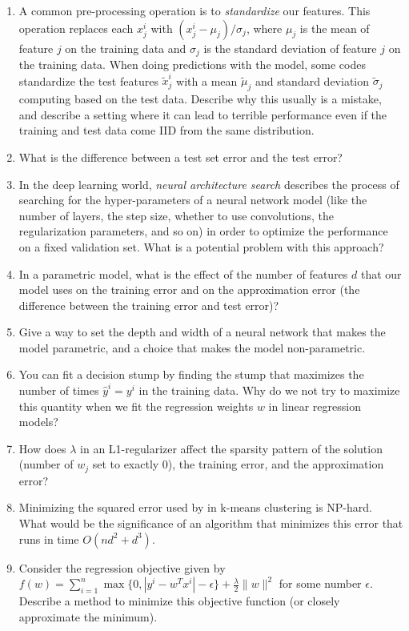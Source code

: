 \documentclass{article}
\def\blu#1{{\color{blu}#1}}
\def\norm#1{\|#1\|}
\def\enum#1{\begin{enumerate}#1\end{enumerate}}
\begin{document}
\blu{
\enum{
\item A common pre-processing operation is to \emph{standardize} our features. This operation replaces each $x_j^i$ with $(x_j^i - \mu_j)/\sigma_j$, where $\mu_j$ is the mean of feature $j$ on the training data and $\sigma_j$ is the standard deviation of feature $j$ on the training data. When doing predictions with the model, some codes standardize the test features $\tilde{x}_j^i$ with a mean $\tilde{\mu}_j$ and standard deviation $\tilde{\sigma}_j$ computing based on the test data. Describe why this usually is a mistake, and describe a setting where it can lead to terrible performance even if the training and test data come IID from the same distribution.
\item What is the difference between a test set error and the test error?
\item  In the deep learning world, \emph{neural architecture search} describes the process of searching for the hyper-parameters of a neural network model (like the number of layers, the step size, whether to use convolutions, the regularization parameters, and so on) in order to optimize the performance on a fixed validation set. What is a potential problem with this approach?
\item In a parametric model, what is the effect of the number of features $d$ that our model uses on the training error and on the approximation error (the difference between the training error and test error)?
\item Give a way to set the depth and width of a neural network that makes the model parametric, and a choice that makes the model non-parametric.
\item You can fit a decision stump by finding the stump that maximizes the number of times $\hat{y}^i = y^i$ in the training data. Why do we not try to maximize this quantity when we fit the regression weights $w$ in linear regression models?
\item  How does $\lambda$ in an L1-regularizer affect the sparsity pattern of the solution (number of $w_j$ set to exactly 0), the training error, and the approximation error?
\item Minimizing the squared error used by in k-means clustering is NP-hard. What would be the significance of an algorithm that minimizes this error that runs in time $O(nd^2 + d^3)$.
\item Consider the regression objective given by $f(w) =\sum_{i=1}^n\max\{0,|y^i - w^Tx^i| - \epsilon\} + \frac{\lambda}{2}\norm{w}^2$ for some number $\epsilon$. Describe a method to minimize this objective function (or closely approximate the minimum).
}}
\end{document}
